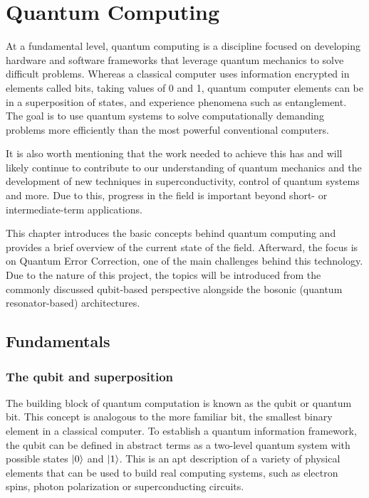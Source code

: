 
\chapter{Quantum Computing}
 
At a fundamental level, quantum computing is a discipline focused on developing hardware and software frameworks that leverage quantum mechanics to solve difficult problems. Whereas a classical computer uses information encrypted in elements called bits, taking values of 0 and 1, quantum computer elements can be in a superposition of states, and experience phenomena such as entanglement. The goal is to use quantum systems to solve computationally demanding problems more efficiently than the most powerful conventional computers. 

It is also worth mentioning that the work needed to achieve this has and will likely continue to contribute to our understanding of quantum mechanics and the development of new techniques in superconductivity, control of quantum systems and more. Due to this, progress in the field is important beyond short- or intermediate-term applications.

This chapter introduces the basic concepts behind quantum computing and provides a brief overview of the current state of the field. Afterward, the focus is on Quantum Error Correction, one of the main challenges behind this technology. Due to the nature of this project, the topics will be introduced from the commonly discussed qubit-based perspective alongside the bosonic (quantum resonator-based) architectures.

\section{Fundamentals}
\subsection{The qubit and superposition}

The building block of quantum computation is known as the qubit or quantum bit. This concept is analogous to the more familiar bit, the smallest binary element in a classical computer. To establish a quantum information framework, the qubit can be defined in abstract terms as a two-level quantum system with possible states $\ket{0}$ and $\ket{1}$. This is an apt description of a variety of physical elements that can be used to build real computing systems, such as electron spins, photon polarization or superconducting circuits.

